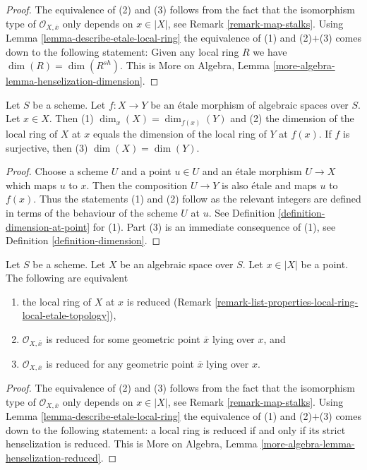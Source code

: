 \begin{proof}
The equivalence of (2) and (3) follows from the fact that the
isomorphism type of $\mathcal{O}_{X, \overline{x}}$ only depends
on $x \in |X|$, see Remark \ref{remark-map-stalks}.
Using Lemma \ref{lemma-describe-etale-local-ring}
the equivalence of (1) and (2)$+$(3) comes down to the
following statement: Given any local ring $R$ we have
$\dim(R) = \dim(R^{sh})$. This is
More on Algebra, Lemma \ref{more-algebra-lemma-henselization-dimension}.
\end{proof}

\begin{lemma}
\label{lemma-dimension-decent-invariant-under-etale}
Let $S$ be a scheme. Let $f : X \to Y$ be an \'etale morphism
of algebraic spaces over $S$. Let $x \in X$. Then
(1) $\dim_x(X) = \dim_{f(x)}(Y)$ and (2) the dimension of
the local ring of $X$ at $x$ equals the dimension of
the local ring of $Y$ at $f(x)$. If $f$ is surjective, then
(3) $\dim(X) = \dim(Y)$.
\end{lemma}

\begin{proof}
Choose a scheme $U$ and a point $u \in U$ and an \'etale morphism
$U \to X$ which maps $u$ to $x$. Then the composition $U \to Y$
is also \'etale and maps $u$ to $f(x)$. Thus the statements (1) and (2)
follow as the relevant integers are defined in terms of the behaviour
of the scheme $U$ at $u$. See
Definition \ref{definition-dimension-at-point} for (1). Part (3) is
an immediate consequence of (1), see Definition \ref{definition-dimension}.
\end{proof}

\begin{lemma}
\label{lemma-reduced-local-ring}
Let $S$ be a scheme. Let $X$ be an algebraic space over $S$.
Let $x \in |X|$ be a point. The following are equivalent
\begin{enumerate}
\item the local ring of $X$ at $x$ is reduced
(Remark \ref{remark-list-properties-local-ring-local-etale-topology}),
\item $\mathcal{O}_{X, \overline{x}}$ is reduced for some geometric
point $\overline{x}$ lying over $x$, and
\item $\mathcal{O}_{X, \overline{x}}$ is reduced for any geometric
point $\overline{x}$ lying over $x$.
\end{enumerate}
\end{lemma}

\begin{proof}
The equivalence of (2) and (3) follows from the fact that the
isomorphism type of $\mathcal{O}_{X, \overline{x}}$ only depends
on $x \in |X|$, see Remark \ref{remark-map-stalks}.
Using Lemma \ref{lemma-describe-etale-local-ring}
the equivalence of (1) and (2)$+$(3) comes down to the
following statement: a local ring is reduced if and only if
its strict henselization is reduced. This is
More on Algebra, Lemma \ref{more-algebra-lemma-henselization-reduced}.
\end{proof}











